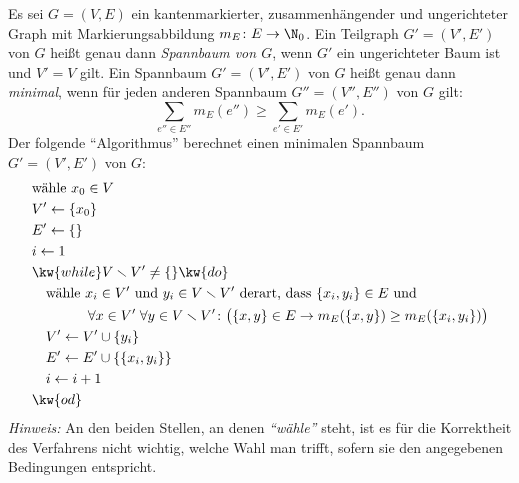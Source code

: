 \documentclass[12pt]{article}
\begin{document}
\begin{aufgabe}[4]
  Es sei $G = (V, E)$ ein kantenmarkierter, zusammenhängender und ungerichteter Graph mit Markierungsabbildung $m_E \colon E \to \N_0$. Ein Teilgraph $G' = (V', E')$ von $G$ heißt genau dann \emph{Spannbaum von $G$}, wenn $G'$ ein ungerichteter Baum ist und $V' = V$ gilt. Ein Spannbaum $G' = (V', E')$ von $G$ heißt genau dann \emph{minimal}, wenn für jeden anderen Spannbaum $G'' = (V'', E'')$ von $G$ gilt:
  \begin{equation*}
    \sum_{e'' \in E''} m_E(e'') \geq \sum_{e' \in E'} m_E(e').
  \end{equation*}
  Der folgende "`Algorithmus"' berechnet einen minimalen Spannbaum $G' = (V', E')$ von $G$:
  \begin{align*}
    & \text{wähle } x_0 \in V\\
    & V' \gets \{x_0\}\\
    & E' \gets \{\}\\
    & i \gets 1\\
    & \kw{while } V \smallsetminus V' \neq \{\} \kw{ do}\\
    & \quad \text{wähle } x_i \in V' \text{ und } y_i \in V \smallsetminus V' \text{ derart, dass } \{x_i, y_i\} \in E \text{ und}\\
    & \quad \quad \quad \quad \forall x \in V'\; \forall y \in V \smallsetminus V' \colon \bigl(\{x, y\} \in E \rightarrow m_E(\{x, y\}) \geq m_E(\{x_i, y_i\})\bigr)\\
    & \quad V' \gets V' \cup \{y_i\}\\
    & \quad E' \gets E' \cup \{\{x_i, y_i\}\}\\
    & \quad i \gets i + 1\\
    & \kw{od}
  \end{align*}
  \emph{Hinweis:} An den beiden Stellen, an denen \emph{"`wähle"'} steht, ist es für
  die Korrektheit des Verfahrens nicht wichtig, welche Wahl man
  trifft, sofern sie den angegebenen Bedingungen entspricht.


\end{aufgabe}
\end{document}
